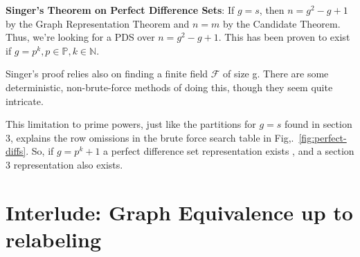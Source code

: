 \documentclass[11pt, oneside]{article} 	%
\begin{document}
\begin{framed}
\textbf{Singer's Theorem on Perfect Difference Sets}: If $g=s$, then $n=g^2-g+1$ by the Graph Representation Theorem and $n=m$ by the Candidate Theorem. Thus, we're looking for a PDS over $n=g^2-g+1$. This has been proven to exist if $g =p^k, p \in \mathbb{P}, k \in \mathbb{N}$. 
\end{framed}

Singer's proof relies also on finding a finite field $\mathcal{F}$ of size g. There are some deterministic, non-brute-force methods of doing this\cite{4}, though they seem quite intricate.

This limitation to prime powers, just like the partitions for $g=s$ found in section 3, explains the row omissions in the brute force search table in Fig,.~\ref{fig:perfect-diffs}. So, if $g=p^k+1$ a perfect difference set representation exists , and a section 3 representation also exists. 

\section{Interlude: Graph Equivalence up to relabeling}
\end{document}
